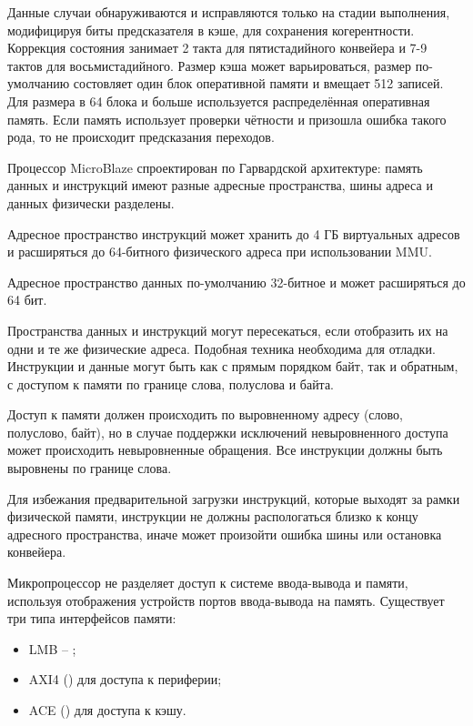 Данные случаи обнаруживаются и исправляются только на стадии выполнения,
модифицируя биты предсказателя в кэше, для сохранения когерентности.
Коррекция состояния занимает 2 такта для пятистадийного конвейера и 7-9 тактов
для восьмистадийного. Размер кэша может варьироваться, размер по-умолчанию
состовляет один блок оперативной памяти и вмещает 512 записей.
Для размера в 64 блока и больше используется распределённая оперативная
память. Если память использует проверки чётности и призошла ошибка такого рода,
то не происходит предсказания переходов.

Процессор MicroBlaze спроектирован по Гарвардской архитектуре: память данных и инструкций
имеют разные адресные пространства, шины адреса и данных физически разделены.

Адресное пространство инструкций может хранить до 4 ГБ виртуальных адресов и
расширяться до 64-битного физического адреса при использовании MMU.

Адресное пространство данных по-умолчанию 32-битное и может расширяться до 64 бит.

Пространства данных и инструкций могут пересекаться, если отобразить их на одни и те же
физические адреса. Подобная техника необходима для отладки. Инструкции и данные могут быть
как с прямым порядком байт, так и обратным, с доступом к памяти по границе слова, полуслова и байта.

Доступ к памяти должен происходить по выровненному адресу (слово, полуслово, байт), но в случае
поддержки исключений невыровненного доступа может происходить невыровненные обращения. Все инструкции
должны быть выровнены по границе слова.

Для избежания предварительной загрузки инструкций, которые выходят за рамки физической памяти, инструкции
не должны распологаться близко к концу адресного пространства, иначе может произойти ошибка шины или
остановка конвейера.

Микропроцессор не разделяет доступ к системе ввода-вывода и памяти, используя отображения
устройств портов ввода-вывода на память. Существует три типа интерфейсов памяти:
\begin{itemize}
   \item LMB -- ;
   \item AXI4 () для доступа к периферии;
   \item ACE () для доступа к кэшу.
\end{itemize}


